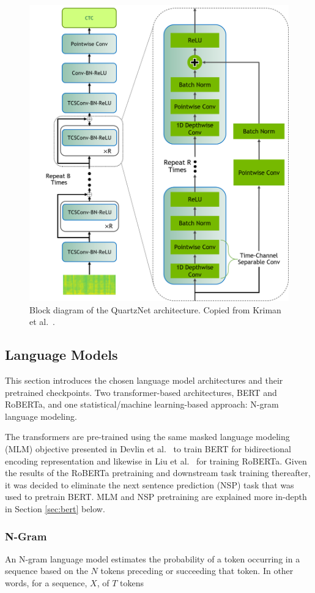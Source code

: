 \documentclass[12pt]{article}
\begin{document}
\begin{figure}
    \centering
    \includegraphics[width=0.5\linewidth]{figures/quartz_vertical.png}
    \caption{Block diagram of the QuartzNet architecture. Copied from Kriman et al.~\cite{kriman_quartznet_2020}.}
    \label{fig:quartznet}
\end{figure}

\subsection{Language Models}\label{sec:language_models}
This section introduces the chosen language model architectures and their pretrained checkpoints. Two transformer-based architectures, BERT and
RoBERTa, and one statistical/machine learning-based approach: N-gram language modeling.

The transformers are pre-trained using the same masked language modeling (MLM) objective presented in Devlin et al.~\cite{devlin_bert_2019} to train
BERT for bidirectional encoding representation and likewise in Liu et al.~\cite{liu_roberta_2019} for training RoBERTa. Given the results of the
RoBERTa pretraining and downstream task training thereafter, it was decided to eliminate the next sentence prediction (NSP) task that was used to
pretrain BERT. MLM and NSP pretraining are explained more in-depth in Section \ref{sec:bert} below.

\subsubsection{N-Gram}\label{sec:ngram}
An N-gram language model estimates the probability of a token occurring in a sequence based on the $N$ tokens preceding or succeeding that token.
In other words, for a sequence, $X$, of $T$ tokens
\end{document}
